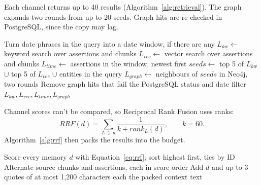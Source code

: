 Each channel returns up to 40 results (Algorithm~\ref{alg:retrieval}). The graph expands two
rounds from up to 20 seeds. Graph hits are re-checked in PostgreSQL, since the copy may lag.

\begin{algorithm}[!htbp]
\caption{Hybrid retrieval and graph traversal}
\label{alg:retrieval}
\begin{algorithmic}[1]
\State Turn date phrases in the query into a date window, if there are any
\State $L_{kw} \gets$ keyword search over assertions and chunks
\State $L_{vec} \gets$ vector search over assertions and chunks
  \State $L_{time} \gets$ assertions in the window, newest first
\EndIf
\State $\mathit{seeds} \gets$ top 5 of $L_{kw}$ $\cup$ top 5 of $L_{vec}$ $\cup$ entities in the query
\State $L_{graph} \gets$ neighbours of $\mathit{seeds}$ in Neo4j, two rounds
\State Remove graph hits that fail the PostgreSQL status and date filter
\State \Return $L_{kw}, L_{vec}, L_{time}, L_{graph}$
\end{algorithmic}
\end{algorithm}

Channel scores can't be compared, so Reciprocal Rank Fusion \cite{cormack2009rrf} uses ranks:
\begin{equation}
\label{eq:rrf}
\mathit{RRF}(d) = \sum_{L \,\ni\, d} \frac{1}{k + \mathit{rank}_L(d)}, \qquad k = 60.
\end{equation}
Algorithm~\ref{alg:rrf} then packs the results into the budget.

\begin{algorithm}[!htbp]
\caption{Reciprocal Rank Fusion and context packing}
\label{alg:rrf}
\begin{algorithmic}[1]
\State Score every memory $d$ with Equation~\eqref{eq:rrf}; sort highest first, ties by ID
  \State Alternate source chunks and assertions, each in score order
\EndIf
{}
    \State Add $d$ and up to 3 quotes of at most 1,200 characters each
  \EndIf
\EndFor
\State \Return the packed context text
\end{algorithmic}
\end{algorithm}

